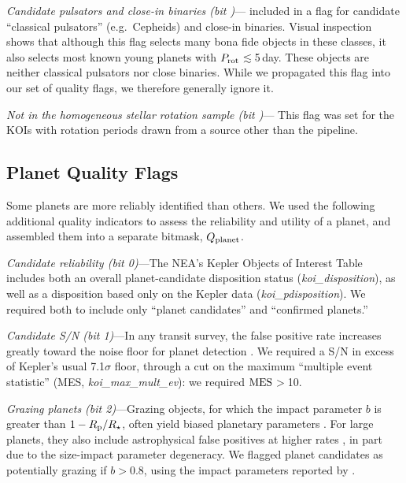 \documentclass[11pt,twocolumn,tighten,linenumbers,trackchanges]{aastex63}
\begin{document}
{\it Candidate pulsators and close-in binaries (bit
)}---\citeauthor{Santos_2021} included in a flag for candidate
``classical pulsators'' (e.g.\ Cepheids) and close-in binaries.
Visual inspection shows that although this flag selects many bona fide
objects in these classes, it also selects most known young planets
with $P_{\rm rot}$$\lesssim$5\,day.  These objects are
neither classical pulsators nor close binaries.  While we propagated
this flag into our set of quality flags, we therefore generally ignore
it.

{\it Not in the homogeneous stellar rotation sample (bit )}--- This
flag was set for the KOIs with rotation periods drawn from a source
other than the \citeauthor{Santos_2019} pipeline.




\subsection{Planet Quality Flags} \label{subsec:plflags} Some planets
are more reliably identified than others.  We used the following
additional quality indicators to assess the reliability and utility of
a planet, and assembled them into a separate bitmask, $Q_{\rm
planet}$.

{\it Candidate reliability (bit 0)}---The NEA's Kepler Objects of
Interest Table includes both an overall planet-candidate disposition
status ({\it koi\_disposition}), as well as a disposition based only
on the Kepler data ({\it koi\_pdisposition}).  We required both to
include only ``planet candidates'' and ``confirmed planets.'' 

{\it Candidate S/N (bit 1)}---In any transit survey, the false
positive rate increases greatly toward the noise floor for planet
detection \citep[e.g.][]{2002ApJ...564..495J}.  We required a S/N in
excess of Kepler's usual 7.1$\sigma$ floor, through a cut on the
maximum ``multiple event statistic'' (MES, {\it koi\_max\_mult\_ev}):
we required ${\rm MES}$$>$10.

{\it Grazing planets (bit 2)}---Grazing objects, for which the impact
parameter $b$ is greater than $1-R_{\rm p}/R_\star$, often yield
biased planetary parameters \citep[e.g.][]{2022AJ....163..111G}.  For
large planets, they also include astrophysical false positives at
higher rates \citep{2016ApJ...822...86M}, in part due to the
size-impact parameter degeneracy.  We flagged planet candidates as
potentially grazing if $b$$>$0.8, using the impact parameters reported
by \citet{Thompson_2018}.
\end{document}
